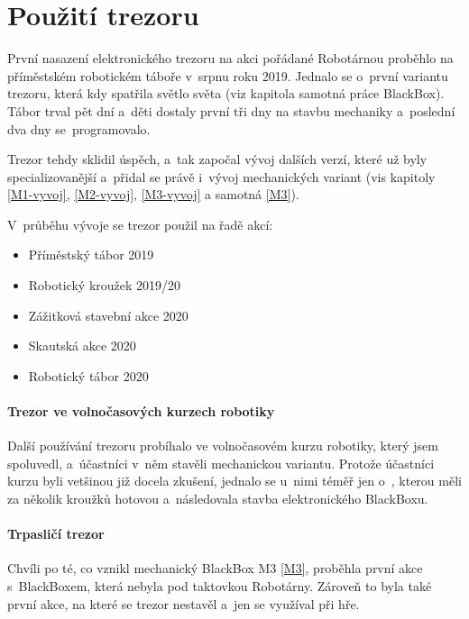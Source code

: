 \section{Použití trezoru}
První nasazení elektronického trezoru na akci pořádané Robotárnou \parencite{robotarna} 
proběhlo na příměstském robotickém táboře v~srpnu roku 2019.
Jednalo se o~první variantu trezoru, která kdy spatřila světlo světa (viz kapitola samotná práce BlackBox). 
Tábor trval pět dní a~děti dostaly první tři dny na stavbu mechaniky a~poslední dva dny 
se~programovalo. 

Trezor tehdy sklidil úspěch, a~tak započal vývoj dalších verzí, které už byly specializovanější 
a~přidal se právě i~vývoj mechanických variant (vis kapitoly \ref{M1-vyvoj}, \ref{M2-vyvoj}, \ref{M3-vyvoj} a samotná \ref{M3}).

V~průběhu vývoje se trezor použil na řadě akcí:

\begin{itemize}
    \item Příměstský tábor 2019 
    \item Robotický kroužek 2019/20
    \item Zážitková stavební akce 2020  %
    \item Skautská akce 2020
    \item Robotický tábor 2020
\end{itemize}

\paragraph{Trezor ve volnočasových kurzech robotiky}
Další používání trezoru pro\-bí\-ha\-lo ve volnočasovém kurzu robotiky, který jsem spoluvedl, a~účastníci 
v~něm stavěli mechanickou variantu.
Protože účastníci kurzu byli vetšinou již docela zkušení, jednalo se u~nimi téměř jen o~, 
kterou měli za několik kroužků hotovou a~následovala stavba elektronického BlackBoxu.

\paragraph{Trpasličí trezor}
Chvíli po té, co vznikl mechanický BlackBox M3 \ref{M3}, proběhla první akce s~BlackBoxem, 
která nebyla pod taktovkou Robotárny. 
Zároveň to byla také první akce, na které se trezor nestavěl a~jen se využíval při hře.


